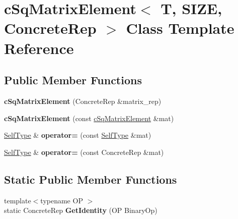 \hypertarget{classcSqMatrixElement}{
\section{c\-Sq\-Matrix\-Element$<$ \-T, \-S\-I\-Z\-E, \-Concrete\-Rep $>$ \-Class \-Template \-Reference}
\label{classcSqMatrixElement}
}
\subsection*{\-Public \-Member \-Functions}
\begin{DoxyCompactItemize}
\item 
\hypertarget{classcSqMatrixElement_a615433d10518b5f93677bf412afaba8e}{
{\bfseries c\-Sq\-Matrix\-Element} (\-Concrete\-Rep \&matrix\-\_\-rep)}
\label{classcSqMatrixElement_a615433d10518b5f93677bf412afaba8e}

\item 
\hypertarget{classcSqMatrixElement_a9de33c865c25184ea239d640ab664b12}{
{\bfseries c\-Sq\-Matrix\-Element} (const \hyperlink{classcSqMatrixElement}{c\-Sq\-Matrix\-Element} \&mat)}
\label{classcSqMatrixElement_a9de33c865c25184ea239d640ab664b12}

\item 
\hypertarget{classcSqMatrixElement_a6e3b64d62a1b4be9c7cafc7e2968f5d8}{
\hyperlink{classcSqMatrixElement}{\-Self\-Type} \& {\bfseries operator=} (const \hyperlink{classcSqMatrixElement}{\-Self\-Type} \&mat)}
\label{classcSqMatrixElement_a6e3b64d62a1b4be9c7cafc7e2968f5d8}

\item 
\hypertarget{classcSqMatrixElement_a616ff5e2a9781d88aa48ecab0d99891e}{
\hyperlink{classcSqMatrixElement}{\-Self\-Type} \& {\bfseries operator=} (const \-Concrete\-Rep \&mat)}
\label{classcSqMatrixElement_a616ff5e2a9781d88aa48ecab0d99891e}

\end{DoxyCompactItemize}
\subsection*{\-Static \-Public \-Member \-Functions}
\begin{DoxyCompactItemize}
\item 
\hypertarget{classcSqMatrixElement_a45a21953fcc80438abc4b607fd57859f}{
{\footnotesize template$<$typename O\-P $>$ }\\static \-Concrete\-Rep {\bfseries \-Get\-Identity} (\-O\-P \-Binary\-Op)}
\label{classcSqMatrixElement_a45a21953fcc80438abc4b607fd57859f}

\end{DoxyCompactItemize}
